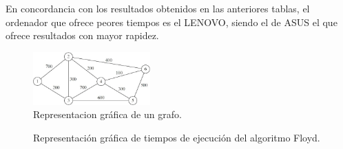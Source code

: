 \documentclass{homework}
\begin{document}
    En concordancia con los resultados obtenidos en las anteriores tablas, el ordenador que ofrece peores
    tiempos es el LENOVO, siendo el de ASUS el que ofrece resultados con mayor rapidez. 

    \begin{figure}[h]
        \centering
        \includegraphics[width=0.4\textwidth]{img/graf-floyd.jpeg}
        \caption{Representacion gráfica de un grafo.}
    \end{figure}

    \begin{figure}
        \centering


        \caption{Representación gráfica de tiempos de ejecución del algoritmo Floyd.}

        \label{emp:floyd}
    \end{figure}
    
\end{document}
